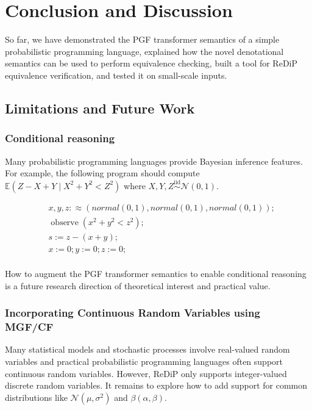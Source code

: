 \documentclass[a4paper]{article}
\DeclareMathOperator*{\iid}{iid}
\newcommand{\E}{ \mathbb{E} }
\begin{document}
\section{Conclusion and Discussion}

So far, we have demonstrated the PGF transformer semantics of a simple probabilistic programming language,
explained how the novel denotational semantics can be used to perform equivalence checking,
built a tool for ReDiP equivalence verification,
and tested it on small-scale inputs.\par

\subsection{Limitations and Future Work}

\subsubsection{Conditional reasoning}
Many probabilistic programming languages provide Bayesian inference features.
For example, the following program should compute \(\E(Z - X + Y\mid X^2+Y^2 < Z^2)\) where \(X,Y,Z\stackrel{\iid}{\sim}\mathcal{N}(0,1)\).

\begin{align*}
	 & x,y,z :\approx (normal(0,1),normal(0,1),normal(0,1)); \\
	 & \operatorname{observe}(x^2 + y^2 < z^2);              \\
	 & s := z - (x + y);                                     \\
	 & x := 0; y := 0; z := 0;                               \\
\end{align*}

How to augment the PGF transformer semantics to enable conditional reasoning is a future research direction of theoretical interest and practical value.

\subsubsection{Incorporating Continuous Random Variables using MGF/CF}
Many statistical models and stochastic processes involve real-valued random variables and practical probabilistic programming languages often support continuous random variables.
However, ReDiP only supports integer-valued discrete random variables.
It remains to explore how to add support for common distributions like \(\mathcal{N}(\mu,\sigma^2)\) and \(\beta(\alpha,\beta)\).\par
\end{document}
